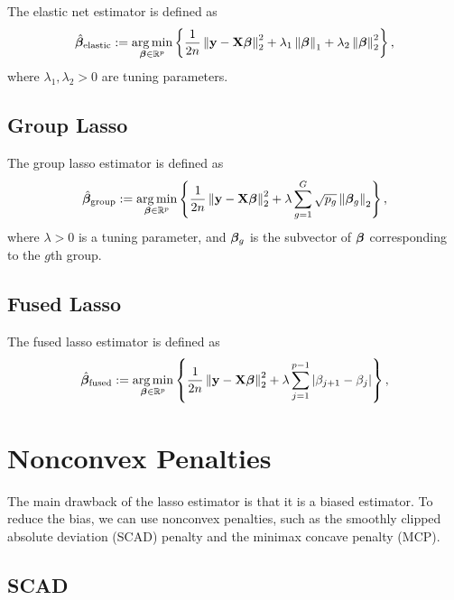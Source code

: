 The elastic net estimator is defined as
\begin{equation*}
	\hat{\boldsymbol{\beta}}_{\text{elastic}}:=\underset{\boldsymbol{\beta}\in{\mathbb R}^{p}}{\arg\min}\left\{\frac{1}{2n}\left\|{\bf y}-{\bf X}\boldsymbol{\beta}\right\|_{2}^{2}+\lambda_{1}\left\|\boldsymbol{\beta}\right\|_{1}+\lambda_{2}\left\|\boldsymbol{\beta}\right\|_{2}^{2}\right\},
\end{equation*}
where $\lambda_{1},\lambda_{2}>0$ are tuning parameters.

\subsection{Group Lasso}

The group lasso estimator is defined as
\begin{equation*}
	\hat{\boldsymbol{\beta}}_{\text{group}}:=\underset{\boldsymbol{\beta}\in{\mathbb R}^{p}}{\arg\min}\left\{\frac{1}{2n}\left\|{\bf y}-{\bf X}\boldsymbol{\beta}\right\|_{2}^{2}+\lambda\sum_{g=1}^{G}\sqrt{p_{g}}\left\|\boldsymbol{\beta}_{g}\right\|_{2}\right\},
\end{equation*}
where $\lambda>0$ is a tuning parameter, and $\boldsymbol{\beta}_{g}$ is the subvector of $\boldsymbol{\beta}$ corresponding to the $g$th group.

\subsection{Fused Lasso}

The fused lasso estimator is defined as
\begin{equation*}
	\hat{\boldsymbol{\beta}}_{\text{fused}}:=\underset{\boldsymbol{\beta}\in{\mathbb R}^{p}}{\arg\min}\left\{\frac{1}{2n}\left\|{\bf y}-{\bf X}\boldsymbol{\beta}\right\|_{2}^{2}+\lambda\sum_{j=1}^{p-1}\left|\beta_{j+1}-\beta_{j}\right|\right\},
\end{equation*}

\section{Nonconvex Penalties}

The main drawback of the lasso estimator is that it is a biased estimator. To reduce the bias, we can use nonconvex penalties, such as the smoothly clipped absolute deviation (SCAD) penalty and the minimax concave penalty (MCP).

\subsection{SCAD}

